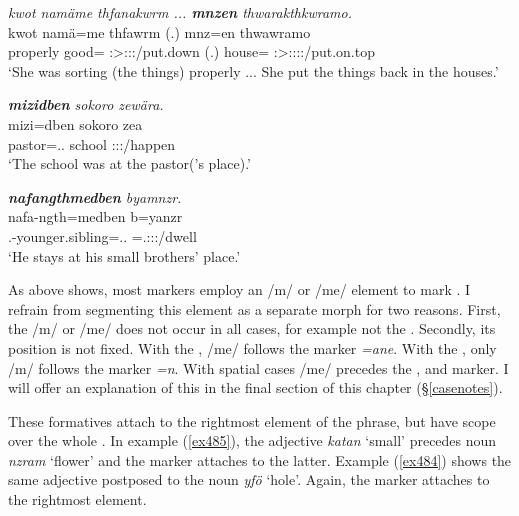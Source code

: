 \begin{exe}
	\ex \emph{kwot namäme thfanakwrm ... \textbf{mnzen} thwarakthkwramo.}\\
	\gll kwot namä=me thfawrm (.) mnz=en thwawramo\\
	properly good=\Ins{} \Stsg:\Sbj>\Stpl:\Obj:\Pst:\Dur/put.down (.) house=\Loc{} \Stsg:\Sbj>\Stpl:\Io:\Pst:\Dur:\Andat/put.on.top\\ 
	\trans `She was sorting (the things) properly ... She put the things back in the houses.'
	\label{ex722}
\end{exe}
\begin{exe}
	\ex \emph{\textbf{mizidben} sokoro zewära.}\\
	\gll mizi=dben sokoro zea\\
	pastor=\Loc.\Anim.\Sg{} school \Sg:\Sbj:\Pst:\Pfv/happen\\
	\trans `The school was at the pastor('s place).'
	\label{ex723}
\end{exe}	
\begin{exe}
	\ex \emph{\textbf{nafangthmedben} byamnzr.}\\
	\gll nafa-ngth=medben b=yanzr\\
	\Third.\Poss-younger.sibling=\Loc.\Anim.\Nsg{} \Med=\Tsg.\Masc:\Sbj:\Nonpast:\Ipfv/dwell\\
	\trans `He stays at his small brothers' place.'
	\label{ex724}
\end{exe}
		 	
As  above shows, most  markers employ an /m/ or /me/ element to mark  . I refrain from segmenting this element as a separate morph for two reasons. First, the /m/ or /me/ does not occur in all cases, for example not the  . Secondly, its position is not fixed. With the , /me/ follows the  marker \emph{=ane}. With the , only /m/ follows the  marker \emph{=n}. With spatial cases /me/ precedes the ,  and  marker. I will offer an explanation of this in the final section of this chapter (\S{}\ref{casenotes}).%

These formatives attach to the rightmost element of the phrase, but have scope over the whole . In example (\ref{ex485}), the adjective \emph{katan} `small' precedes noun \emph{nzram} `flower' and the  marker attaches to the latter. Example (\ref{ex484}) shows the same adjective postposed to the noun \emph{yfö} `hole'. Again, the  marker attaches to the rightmost element.

